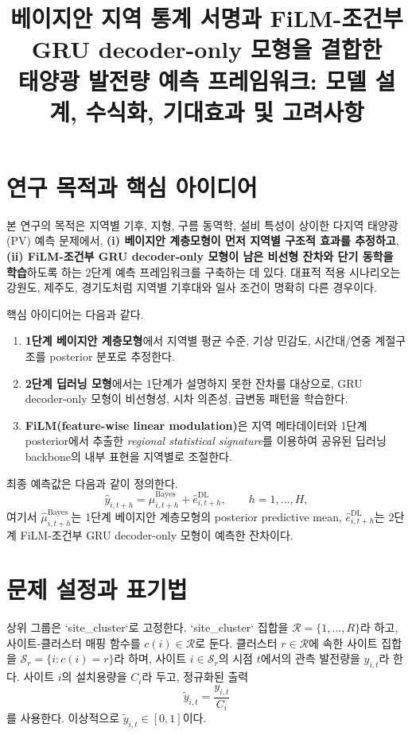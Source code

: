 \documentclass[11pt,a4paper]{article}
\title{베이지안 지역 통계 서명과 FiLM-조건부 GRU decoder-only 모형을 결합한\\
태양광 발전량 예측 프레임워크: 모델 설계, 수식화, 기대효과 및 고려사항}
\author{}
\date{}
\begin{document}
\maketitle

\section{연구 목적과 핵심 아이디어}
본 연구의 목적은 지역별 기후, 지형, 구름 동역학, 설비 특성이 상이한 다지역 태양광(PV) 예측 문제에서, \textbf{(i) 베이지안 계층모형이 먼저 지역별 구조적 효과를 추정하고}, \textbf{(ii) FiLM-조건부 GRU decoder-only 모형이 남은 비선형 잔차와 단기 동학을 학습}하도록 하는 2단계 예측 프레임워크를 구축하는 데 있다. 대표적 적용 시나리오는 강원도, 제주도, 경기도처럼 지역별 기후대와 일사 조건이 명확히 다른 경우이다.

핵심 아이디어는 다음과 같다.
\begin{enumerate}[label=(\arabic*)]
    \item \textbf{1단계 베이지안 계층모형}에서 지역별 평균 수준, 기상 민감도, 시간대/연중 계절구조를 posterior 분포로 추정한다.
    \item \textbf{2단계 딥러닝 모형}에서는 1단계가 설명하지 못한 잔차를 대상으로, GRU decoder-only 모형이 비선형성, 시차 의존성, 급변동 패턴을 학습한다.
    \item \textbf{FiLM(feature-wise linear modulation)}은 지역 메타데이터와 1단계 posterior에서 추출한 \emph{regional statistical signature}를 이용하여 공유된 딥러닝 backbone의 내부 표현을 지역별로 조절한다.
\end{enumerate}

최종 예측값은 다음과 같이 정의한다.
\begin{equation}
    \hat y_{i,t+h} = \hat \mu^{\mathrm{Bayes}}_{i,t+h} + \hat e^{\mathrm{DL}}_{i,t+h}, \qquad h=1,\dots,H,
\end{equation}
여기서 $\hat \mu^{\mathrm{Bayes}}_{i,t+h}$는 1단계 베이지안 계층모형의 posterior predictive mean, $\hat e^{\mathrm{DL}}_{i,t+h}$는 2단계 FiLM-조건부 GRU decoder-only 모형이 예측한 잔차이다.

\section{문제 설정과 표기법}
상위 그룹은 `site_cluster`로 고정한다. `site_cluster` 집합을 $\mathcal R = \{1,\dots,R\}$라 하고, 사이트-클러스터 매핑 함수를 $c(i)\in\mathcal R$로 둔다. 클러스터 $r\in\mathcal R$에 속한 사이트 집합을 $\mathcal S_r=\{i:c(i)=r\}$라 하며, 사이트 $i\in\mathcal S_r$의 시점 $t$에서의 관측 발전량을 $y_{i,t}$라 한다. 사이트 $i$의 설치용량을 $C_i$라 두고, 정규화된 출력
\begin{equation}
    \tilde y_{i,t} = \frac{y_{i,t}}{C_i}
\end{equation}
를 사용한다. 이상적으로 $\tilde y_{i,t}\in[0,1]$이다.
\end{document}
